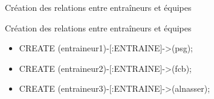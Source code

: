 \begin{frame}{Création des relations entre entraîneurs et équipes}
  \begin{block}{Création des relations entre entraîneurs et équipes}
    \begin{itemize}
      \item CREATE (entraineur1)-[:ENTRAINE]->(psg);
      \item CREATE (entraineur2)-[:ENTRAINE]->(fcb);
      \item CREATE (entraineur3)-[:ENTRAINE]->(alnasser);
    \end{itemize}
  \end{block}
\end{frame}